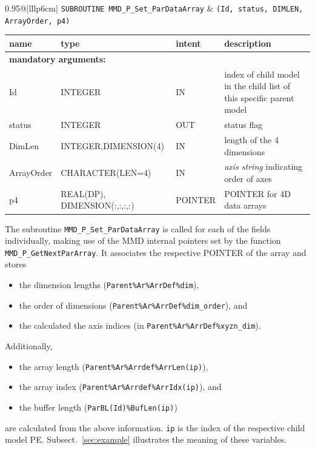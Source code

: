 \documentclass[twoside]{article}
\begin{document}
\begin{itemize}
\begin{tabular*}{0.95\textwidth}{@{\extracolsep\fill}|lllp{6cm}|}
\hline
{}
{\tt SUBROUTINE MMD\_P\_Set\_ParDataArray} &
{\tt (Id, status, DIMLEN, ArrayOrder, p4)}\\
\hline
\end{tabular*}
\begin{tabular*}{0.95\textwidth}{@{\extracolsep\fill}|lllp{6cm}|}
name & type & intent & description\\
\hline
\multicolumn{4}{|l|}{\bf mandatory arguments:}\\
Id & {\footnotesize INTEGER} & IN &  index of child model in the child list of this specific parent model\\
status & {\footnotesize INTEGER} & OUT & status flag \\
DimLen & {\footnotesize INTEGER,DIMENSION(4)} & IN & length of the 4 dimensions \\
ArrayOrder & {\footnotesize CHARACTER(LEN=4)} & IN & {\it axis string} indicating order of axes \\
p4 & {\footnotesize REAL(DP), DIMENSION(:,:,:,:)}& {\footnotesize POINTER} & {\footnotesize POINTER} for 4D data arrays \\
\hline
\end{tabular*}
\smallskip
\vspace*{-0.3cm}

 The subroutine \verb|MMD_P_Set_ParDataArray| is called for each of the
 fields individually, making use of the MMD internal pointers set by
 the function \verb|MMD_P_GetNextParArray|. It associates the
 respective {\footnotesize POINTER} of the array and stores 
\begin{itemize}
\item  the dimension lengths (\verb|Parent%Ar%ArrDef%dim|),
\item  the order of dimensions (\verb|Parent%Ar%ArrDef%dim_order|), and
\item  the calculated the axis indices (in \verb|Parent%Ar%ArrDef%xyzn_dim|).
\end{itemize}
 Additionally,
\begin{itemize} 
\item the array length (\verb|Parent%Ar%Arrdef%ArrLen(ip)|),
\item  the array index (\verb|Parent%Ar%Arrdef%ArrIdx(ip)|), and 
\item the buffer length (\verb|ParBL(Id)%BufLen(ip)|)
\end{itemize}
are calculated from the above information. \verb|ip| is the index of
the respective child model PE.
Subsect.\ \ref{sec:example} illustrates the meaning of these variables.


\end{itemize}
\end{document}
